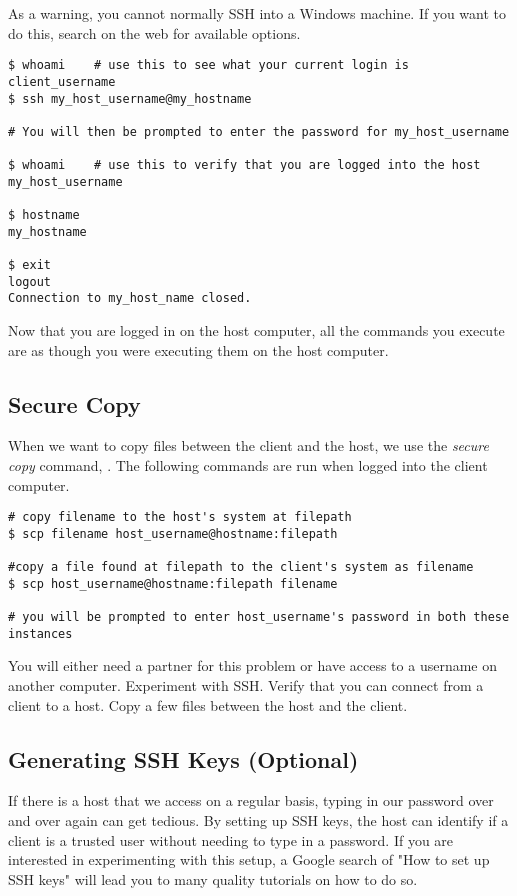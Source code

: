 As a warning, you cannot normally SSH into a Windows machine.
If you want to do this, search on the web for available options.

\begin{lstlisting}
$ whoami    # use this to see what your current login is
client_username
$ ssh my_host_username@my_hostname

# You will then be prompted to enter the password for my_host_username

$ whoami    # use this to verify that you are logged into the host
my_host_username

$ hostname
my_hostname

$ exit
logout
Connection to my_host_name closed.
\end{lstlisting}

Now that you are logged in on the host computer, all the commands you execute are as though you were executing them on the host computer.

\subsection*{Secure Copy}

When we want to copy files between the client and the host, we use the \emph{secure copy} command, .
The following commands are run when logged into the client computer.

\begin{lstlisting}
# copy filename to the host's system at filepath
$ scp filename host_username@hostname:filepath

#copy a file found at filepath to the client's system as filename
$ scp host_username@hostname:filepath filename

# you will be prompted to enter host_username's password in both these instances 
\end{lstlisting}

\begin{problem}
You will either need a partner for this problem or have access to a username on another computer.
Experiment with SSH. Verify that you can connect from a client to a host.
Copy a few files between the host and the client.
\end{problem}

\subsection*{Generating SSH Keys (Optional)}
If there is a host that we access on a regular basis, typing in our password over and over again can get tedious.
By setting up SSH keys, the host can identify if a client is a trusted user without needing to type in a password.
If you are interested in experimenting with this setup, a Google search of "How to set up SSH keys" will lead you to many quality tutorials on how to do so.

